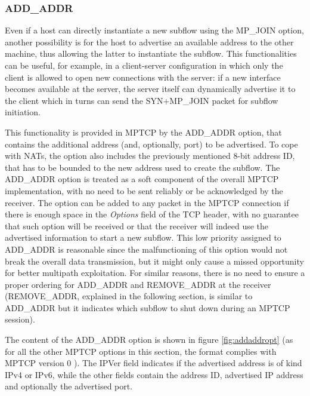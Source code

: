 
\subsubsection{ADD\_ADDR}
Even if a host can directly instantiate a new subflow using the MP\_JOIN option, another possibility is for the host to advertise an available address to the other machine, thus allowing the latter to instantiate the subflow.
This functionalities can be useful, for example, in a client-server configuration in which only the client is allowed to open new connections with the server: if a new interface becomes available at the server, the server itself can dynamically advertise it to the client which in turns can send the SYN+MP\_JOIN packet for subflow initiation.

This functionality is provided in MPTCP by the ADD\_ADDR option, that contains the additional address (and, optionally, port) to be advertised. To cope with NATs, the option also includes the previously mentioned 8-bit address ID, that has to be bounded to the new address used to create the subflow.
The ADD\_ADDR option is treated as a soft component of the overall MPTCP implementation, with no need to be sent reliably or be acknowledged by the receiver. The option can be added to any packet in the MPTCP connection if there is enough space in the \textit{Options} field of the TCP header, with no guarantee that such option will be received or that the receiver will indeed use the advertised information to start a new subflow. This low priority assigned to ADD\_ADDR is reasonable since the malfunctioning of this option would not break the overall data transmission, but it might only cause a missed opportunity for better multipath exploitation. For similar reasons, there is no need to ensure a proper ordering for ADD\_ADDR and REMOVE\_ADDR at the receiver (REMOVE\_ADDR, explained in the following section, is similar to ADD\_ADDR but it indicates which subflow to shut down during an MPTCP session).

The content of the ADD\_ADDR option is shown in figure \ref{fig:addaddropt} (as for all the other MPTCP options in this section, the format complies with MPTCP version 0 \cite{rfc6824}). The IPVer field indicates if the advertised address is of kind IPv4 or IPv6, while the other fields contain the address ID, advertised IP address and optionally the advertised port.

